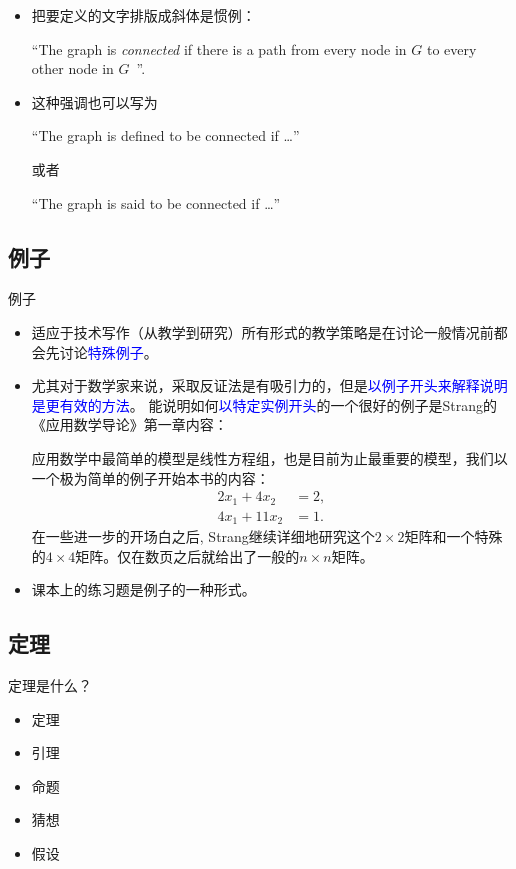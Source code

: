 \documentclass[13pt]{ctexbeamer}
\newcommand{\blue}[1]{\textcolor{blue}{#1}}
\begin{document}
\begin{frame}
	\begin{itemize}
		\item 把要定义的文字排版成斜体是惯例：

		``The graph is \emph{connected} {if}  there is a path from every node in $G$ to every other node in $G$~''.

		\item 这种强调也可以写为

		``The graph is defined to be {connected} {if}  \dots''

		或者

		``The graph is said to be {connected} {if}  \dots''
	\end{itemize}

\end{frame}


\subsection{例子}

\begin{frame}{例子}
	\begin{itemize}
		\item
		适应于技术写作（从教学到研究）所有形式的教学策略是在讨论一般情况前都会先讨论\blue{特殊例子}。
		\item
		尤其对于数学家来说，采取反证法是有吸引力的，但是\blue{以例子开头来解释说明是更有效的方法}。
		能说明如何\blue{以特定实例开头}的一个很好的例子是Strang的《应用数学导论》第一章内容：

		{\small
			应用数学中最简单的模型是线性方程组，也是目前为止最重要的模型，我们以一个极为简单的例子开始本书的内容：
			\begin{align*}
				2 x_1+ 4 x_2& =2,\\
				4 x_1 +11x_2 & =1.
			\end{align*}
			在一些进一步的开场白之后, Strang继续详细地研究这个$2\times 2$矩阵和一个特殊的$4\times 4$矩阵。仅在数页之后就给出了一般的$n \times n$矩阵。}

		\item 课本上的\alert{练习题}是例子的一种形式。
	\end{itemize}


\end{frame}




\subsection{定理}
\begin{frame}{定理是什么？}


\begin{itemize}
	\item 定理
	\item 引理
	\item 命题
	\item 猜想
	\item 假设
\end{itemize}
\end{frame}
\end{document}
